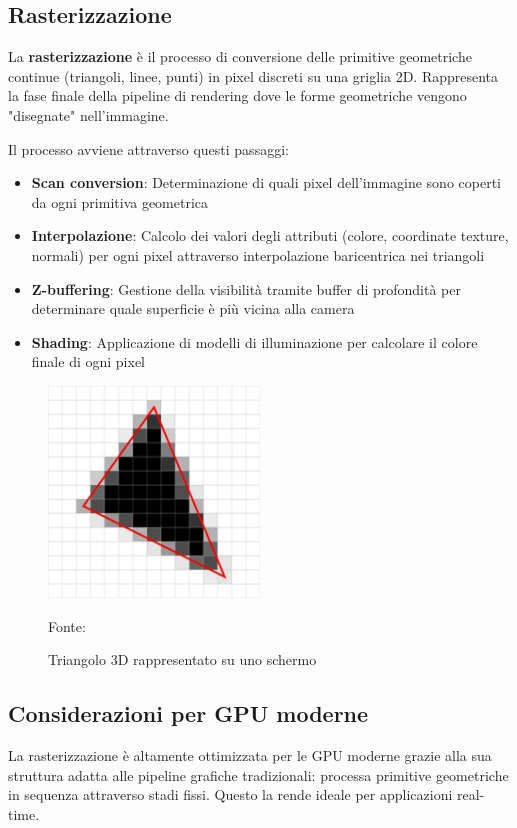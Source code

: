 \subsection{Rasterizzazione}

La \textbf{rasterizzazione} è il processo di conversione delle primitive geometriche continue (triangoli, linee, punti) in pixel discreti su una griglia 2D. Rappresenta la fase finale della pipeline di rendering dove le forme geometriche vengono "disegnate" nell'immagine.

Il processo avviene attraverso questi passaggi:

\begin{itemize}
    \item \textbf{Scan conversion}: Determinazione di quali pixel dell'immagine sono coperti da ogni primitiva geometrica
    \item \textbf{Interpolazione}: Calcolo dei valori degli attributi (colore, coordinate texture, normali) per ogni pixel attraverso interpolazione baricentrica nei triangoli
    \item \textbf{Z-buffering}: Gestione della visibilità tramite buffer di profondità per determinare quale superficie è più vicina alla camera
    \item \textbf{Shading}: Applicazione di modelli di illuminazione per calcolare il colore finale di ogni pixel
\end{itemize}

\begin{figure}[htbp]
    \centering
    \includegraphics[width=0.5\textwidth]{images/rasterization.jpg}
    \caption{Triangolo 3D rappresentato su uno schermo}
    Fonte: \cite{rasterization}
\end{figure}

\subsection{Considerazioni per GPU moderne}
La rasterizzazione è altamente ottimizzata per le GPU moderne grazie alla sua struttura adatta alle pipeline grafiche tradizionali: processa primitive geometriche in sequenza attraverso stadi fissi. Questo la rende ideale per applicazioni real-time.

